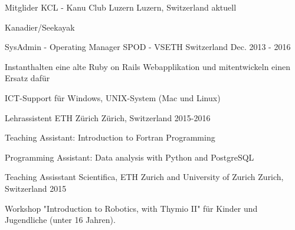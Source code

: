 

\begin{cventries}

\cventry
{Mitglider} %
{KCL - Kanu Club Luzern} %
{Luzern, Switzerland} %
{aktuell} %
{
	\begin{cvitems} %
		\item {Kanadier/Seekayak}
	\end{cvitems}
}
	
\cventry
{SysAdmin - Operating Manager} %
{SPOD - VSETH} %
{Switzerland} %
{Dec. 2013 - 2016} %
{
	\begin{cvitems} %
		\item {Instanthalten eine alte Ruby on Rails Webapplikation und mitentwickeln einen Ersatz dafür}
		\item {ICT-Support für Windows, UNIX-System (Mac und Linux)}
	\end{cvitems}
}

\cventry
	{Lehrassistent} %
	{ETH Zürich} %
	{Zürich, Switzerland} %
	{2015-2016} %
	{
		\begin{cvitems} %
			\item {Teaching Assistant: Introduction to Fortran Programming}
			\item {Programming Assistant: Data analysis with Python and PostgreSQL}
		\end{cvitems}
	}

\cventry
    {Teaching Assisstant} %
    {Scientifica, ETH Zurich and University of Zurich} %
    {Zurich, Switzerland} %
    {2015} %
    {
      \begin{cvitems} %
        \item {Workshop "Introduction to Robotics, with Thymio II" für Kinder und Jugendliche (unter 16 Jahren).}
      \end{cvitems}
    }


\end{cventries}
